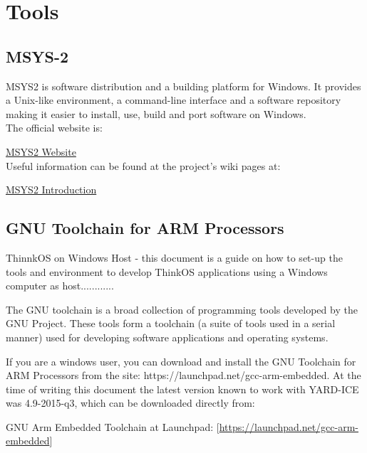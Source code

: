 \section{Tools}

\subsection{MSYS-2}

MSYS2 is software distribution and a building platform for Windows. It provides a Unix-like environment, a command-line interface and a software repository making it easier to install, use, build and port software on Windows.\\

The official website is:

\href{http://www.msys2.org/}{MSYS2 Website}\\

Useful information can be found at the project's wiki pages at: 

\href{https://github.com/msys2/msys2/wiki/MSYS2-introduction}{MSYS2 Introduction}\\

\subsection{GNU Toolchain for ARM Processors}

ThinnkOS on Windows Host - this document is a guide on how to set-up the tools and environment to develop ThinkOS applications using a Windows computer as host............

The GNU toolchain is a broad collection of programming tools developed by the GNU Project. These tools form a toolchain (a suite of tools used in a serial manner) used for developing software applications and operating systems.

If you are a windows user, you can download and install the GNU Toolchain for ARM Processors from the site: https://launchpad.net/gcc-arm-embedded. At the time of writing this document the latest version known to work with YARD-ICE was 4.9-2015-q3, which can be downloaded directly from:

\begin{flushleft}
GNU Arm Embedded Toolchain at Launchpad:
[\href{https://launchpad.net/gcc-arm-embedded}{https://launchpad.net/gcc-arm-embedded}]\\
\end{flushleft}

